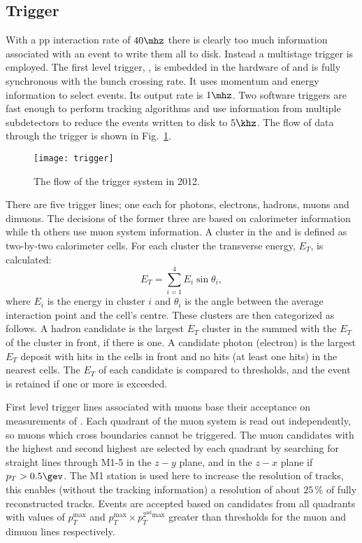 \subsection{Trigger}
With a pp interaction rate of $40\mhz$ there is clearly too much information associated with an event
to write them all to disk.
Instead a multistage trigger is employed.
The first level trigger, \lone, is embedded in the hardware of \lhcb and is fully synchronous with
the bunch crossing rate.
It uses momentum and energy information to select events.
Its output rate is $1\mhz$.
Two software triggers are fast enough to perform tracking algorithms and use information from
multiple subdetectors to reduce the events written to disk to $5\khz$.
The flow of data through the trigger is shown in Fig.~\ref{fig:lhcb:trigger}.

\begin{figure}
  \begin{center}
    \texttt{[image: trigger]}
  \end{center}
  \caption[Trigger sequence]
  {\small
    The flow of the \lhcb trigger system in 2012.
  }
  \label{fig:lhcb:trigger}
\end{figure}

There are five \lone trigger lines; one each for photons, electrons, hadrons, muons and dimuons.
The decisions of the former three are based on calorimeter information while th others use muon
system information.
A cluster in the \ecal and \hcal is defined as two-by-two calorimeter cells.
For each cluster the transverse energy, $E_T$, is calculated:
\begin{equation}
  E_T = \sum_{i=1}^4E_i\sin\theta_i,
\end{equation}
where $E_i$ is the energy in cluster $i$ and $\theta_i$ is the angle between the average
interaction point and the cell's centre.
These clusters are then categorized as follows.
A hadron candidate is the largest $E_T$ cluster in the \hcal summed with the $E_T$ of the \ecal
cluster in front, if there is one.
A candidate photon (electron) is the largest $E_T$ deposit with hits in the \presh cells in front and
no hits (at least one hits) in the nearest \spd cells.
The $E_T$ of each candidate is compared to thresholds, and the event is retained if one or more is
exceeded.

First level trigger lines associated with muons base their acceptance on measurements of \pt.
Each quadrant of the muon system is read out independently, so muons which cross boundaries cannot
be triggered.
The muon candidates with the highest and second highest \pt are selected by each quadrant by
searching for straight lines through M1-5 in the $z-y$ plane, and in the $z-x$ plane if
$p_T>0.5\gev$.
The M1 station is used here to increase the \pt resolution of tracks, this enables (without the
tracking information) a resolution of about $25\,\%$ of fully reconstructed tracks.
Events are accepted based on candidates from all quadrants with values of $p_T^\mathrm{max}$ and
$p_T^\mathrm{max}\times p_T^\mathrm{2^{nd} max}$ greater than thresholds for the muon and dimuon
lines respectively.

